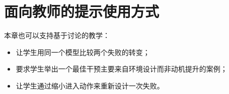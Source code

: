 \section{面向教师的提示使用方式}

本章也可以支持基于讨论的教学：
\begin{itemize}[nosep]
  \item 让学生用同一个模型比较两个失败的转变；
  \item 要求学生举出一个最佳干预主要来自环境设计而非动机提升的案例；
  \item 让学生通过缩小进入动作来重新设计一次失败。
\end{itemize}